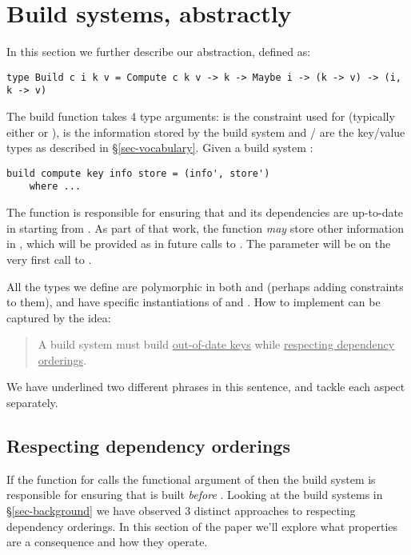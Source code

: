 \section{Build systems, abstractly}\label{sec-build}

In this section we further describe our  abstraction, defined as:

\begin{verbatim}
type Build c i k v = Compute c k v -> k -> Maybe i -> (k -> v) -> (i, k -> v)
\end{verbatim}

The build function takes 4 type arguments:  is the constraint used for  (typically either  or ),  is the information stored by the build system and / are the key/value types as described in \S\ref{sec-vocabulary}. Given a build system :

\begin{verbatim}
build compute key info store = (info', store')
    where ...
\end{verbatim}

The function  is responsible for ensuring that  and its dependencies are up-to-date in  starting from . As part of that work, the  function \textit{may} store other information in , which will be provided as  in future calls to . The  parameter will be  on the very first call to .

All the  types we define are polymorphic in both  and  (perhaps adding constraints to them), and have specific instantiations of  and . How to implement  can be captured by the idea:

\begin{quote}
A build system must build \underline{out-of-date keys} while \underline{respecting dependency orderings}.
\end{quote}

We have underlined two different phrases in this sentence, and tackle each aspect separately.


\subsection{Respecting dependency orderings}

If the  function for  calls the functional argument of  then the build system is responsible for ensuring that  is built \textit{before} . Looking at the build systems in \S\ref{sec-background} we have observed 3 distinct approaches to respecting dependency orderings. In this section of the paper we'll explore what properties are a consequence and how they operate.

